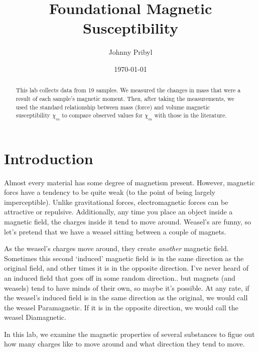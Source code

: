 \documentclass{article}
\date{\today} %
\begin{document}
\title{Foundational Magnetic Susceptibility}
\author{Johnny Pribyl}
\maketitle

\begin{abstract}

    This lab collects data from 19 samples. We measured the changes in mass
    that were a result of each sample's magnetic moment. Then, after taking 
    the measurements, we used the standard relationship between mass (force) 
    and volume magnetic susceptibility $\chi_m$ to compare observed values for $\chi_m$ 
    with those in the literature.

\end{abstract}



\section{Introduction}

Almost every material has some degree of magnetism present. However, magnetic
forcs have a tendency to be quite weak (to the point of being largely
imperceptible). Unlike gravitational forces, electromagnetic forces can be
attractive or repulsive. Additionally, any time you place an object 
inside a magnetic field, the charges inside it tend to move around. 
Weasel's are funny, so let's pretend that we have a weasel sitting between a couple of magnets.

As the weasel's charges move around, they create \textit{another} magnetic field. 
Sometimes this second `induced' magnetic field is in the same direction as the original field, 
and other times it is in the opposite direction. I've never heard of an induced 
field that goes off in some random direction.. but magnets (and weasels) tend to have 
minds of their own, so maybe it's possible. At any rate, if the weasel's induced 
field is in the same direction as the original, we would call the weasel
Paramagnetic. If it is in the opposite direction, we would call the weasel
Diamagnetic.

In this lab, we examine the magnetic properties of several substances to figue
out how many charges like to move around and what direction they tend to move.
\end{document}
